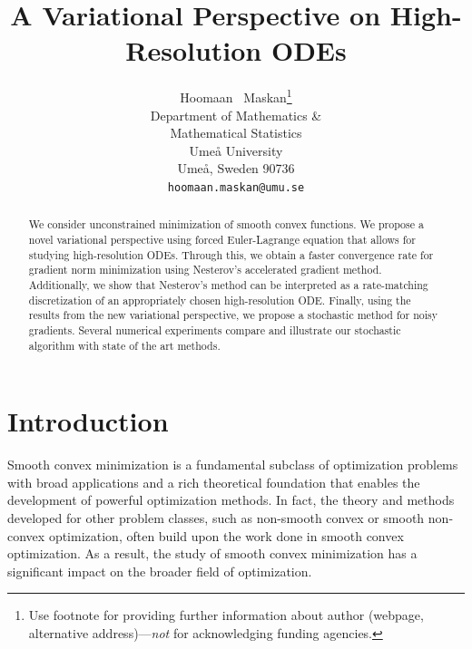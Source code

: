 \documentclass{article}
\title{A Variational Perspective on High-Resolution ODEs}
\author{%
  Hoomaan ~Maskan\thanks{Use footnote for providing further information
    about author (webpage, alternative address)---\emph{not} for acknowledging
    funding agencies.} \\
  Department of Mathematics \& \\Mathematical Statistics\\
  Umeå University\\
  Umeå, Sweden 90736 \\
  \texttt{hoomaan.maskan@umu.se} \\
}
\theoremstyle{plain}
\theoremstyle{definition}
\theoremstyle{remark}
\begin{document}
\maketitle


\begin{abstract}
We consider unconstrained minimization of smooth convex functions. We propose a novel variational perspective using forced Euler-Lagrange equation that allows for studying high-resolution ODEs. Through this, we obtain a faster convergence rate for gradient norm minimization using Nesterov's accelerated gradient method. Additionally, we show that Nesterov's method can be interpreted as a rate-matching discretization of an appropriately chosen high-resolution ODE. Finally, using the results from the new variational perspective, we propose a stochastic method for noisy gradients. Several numerical experiments compare and illustrate our stochastic algorithm with state of the art methods.
\end{abstract}


\section{Introduction}

Smooth convex minimization is a fundamental subclass of optimization problems with broad applications %
and a rich theoretical foundation that enables the development of powerful optimization methods. In fact, the theory and methods developed for other problem classes, such as non-smooth convex or smooth non-convex optimization, often build upon the work done in smooth convex optimization. As a result, the study of smooth convex minimization has a significant impact on the broader field of optimization.
\end{document}
